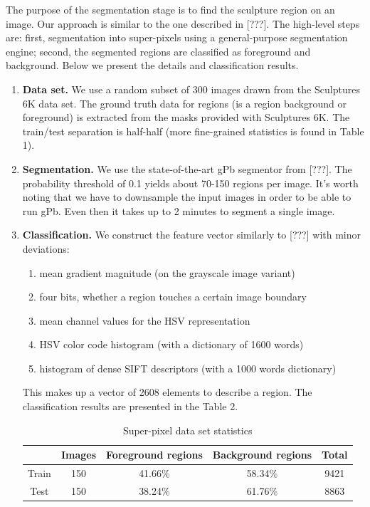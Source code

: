\documentclass{article}
\begin{document}
The purpose of the segmentation stage is to find the sculpture region
on an image. Our approach is similar to the one described in {[}???{]}.
The high-level steps are: first, segmentation into super-pixels using
a general-purpose segmentation engine; second, the segmented regions
are classified as foreground and background. Below we present the
details and classification results.
\begin{enumerate}
\item \textbf{Data set. }We use a random subset of 300 images drawn from
the Sculptures 6K data set. The ground truth data for regions (is
a region background or foreground) is extracted from the masks provided
with Sculptures 6K. The train/test separation is half-half (more fine-grained
statistics is found in Table 1).
\item \textbf{Segmentation. }We use the state-of-the-art gPb segmentor from
{[}???{]}. The probability threshold of 0.1 yields about 70-150 regions
per image. It's worth noting that we have to downsample the input
images in order to be able to run gPb. Even then it takes up to 2
minutes to segment a single image.
\item \textbf{Classification. }We construct the feature vector similarly
to {[}???{]} with minor deviations:

\begin{enumerate}
\item mean gradient magnitude (on the grayscale image variant)
\item four bits, whether a region touches a certain image boundary
\item mean channel values for the HSV representation
\item HSV color code histogram (with a dictionary of 1600 words)
\item histogram of dense SIFT descriptors (with a 1000 words dictionary)
\end{enumerate}

This makes up a vector of 2608 elements to describe a region. The
classification results are presented in the Table 2.

\begin{table}


\caption{Super-pixel data set statistics}


\centering{}%
\begin{tabular}{|c|c|c|c|c|}
\hline 
 & Images & Foreground regions & Background regions & Total\tabularnewline
\hline 
\hline 
Train & 150 & 41.66\% & 58.34\% & 9421\tabularnewline
\hline 
Test & 150 & 38.24\% & 61.76\% & 8863\tabularnewline
\hline 
\end{tabular}
\end{table}
\end{enumerate}
\end{document}
